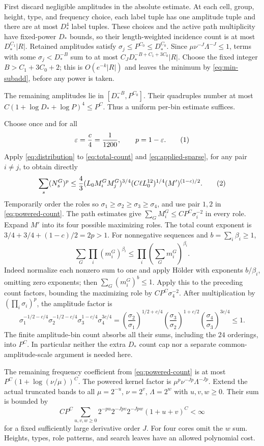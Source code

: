 \documentclass[11pt]{article}
\theoremstyle{definition}
\newcommand{\eqtag}[1]{\refstepcounter{equation}\tag{\theequation}\label{#1}}
\numberwithin{equation}{section}
\begin{document}
First discard negligible amplitudes in the absolute estimate. At each cell, group, height, type, and frequency choice, each label tuple has one amplitude tuple and there are at most $D_*^4$ label tuples. These choices and the active path multiplicity have fixed-power $D_*$ bounds, so their length-weighted incidence count is at most $D_*^{C_1}|R|$. Retained amplitudes satisfy $\sigma_j\le P^{C_0}\le D_*^{C_0}$. Since $\mu\nu^{-J}\Lambda^{-J}\le1$, terms with some $\sigma_j<D_*^{-B}$ sum to at most $C_JD_*^{-B+C_1+3C_0}|R|$. Choose the fixed integer $B>C_1+3C_0+2$; this is $O(e^{-k}|R|)$ and leaves the minimum by \eqref{eq:min-subadd}, before any power is taken.

The remaining amplitudes lie in $[D_*^{-B},P^{C_0}]$. Their quadruples number at most $C(1+\log D_*+\log P)^4\le P^C$. Thus a uniform per-bin estimate suffices.

Choose once and for all
\[
 \varepsilon=\frac{c}{4}=\frac1{1200},\qquad p=1-\varepsilon.
 \eqtag{eq:fixed-power}
\]
Apply \eqref{eq:distribution} to \eqref{eq:total-count} and \eqref{eq:applied-sparse}, for any pair $i\ne j$, to obtain directly
\[
 \sum_s(N_s^G)^p
 \le\frac43(L_0M_i^GM_j^G)^{3/4}(C\ell L_0^{12})^{1/4}(M')^{(1-c)/2}.
 \eqtag{eq:powered-count}
\]
Temporarily order the roles so $\sigma_1\ge\sigma_2\ge\sigma_3\ge\sigma_4$, and use pair $1,2$ in \eqref{eq:powered-count}. The path estimates give $\sum_GM_i^G\le CP^C\sigma_i^{-2}$ in every role. Expand $M'$ into its four possible maximizing roles. The total count exponent is $3/4+3/4+(1-c)/2=2p>1$. For nonnegative sequences and $b=\sum_i\beta_i\ge1$,
\[
 \sum_G\prod_i(m_i^G)^{\beta_i}
 \le\prod_i\left(\sum_Gm_i^G\right)^{\beta_i}.
\]
Indeed normalize each nonzero sum to one and apply H\"older with exponents $b/\beta_i$, omitting zero exponents; then $\sum_G(m_i^G)^b\le1$. Apply this to the preceding count factors, bounding the maximizing role by $CP^C\sigma_4^{-2}$. After multiplication by $(\prod_i\sigma_i)^p$, the amplitude factor is
\[
 \sigma_1^{-1/2-c/4}\sigma_2^{-1/2-c/4}
 \sigma_3^{1-c/4}\sigma_4^{3c/4}
 =\left(\frac{\sigma_2}{\sigma_1}\right)^{1/2+c/4}
  \left(\frac{\sigma_3}{\sigma_2}\right)^{1+c/2}
  \left(\frac{\sigma_4}{\sigma_3}\right)^{3c/4}\le1.
\]
The finite amplitude-bin count absorbs all their sums, including the $24$ orderings, into $P^C$. In particular neither the extra $D_*$ count cap nor a separate common-amplitude-scale argument is needed here.

The remaining frequency coefficient from \eqref{eq:powered-count} is at most $P^C(1+\log(\nu/\mu))^C$. The powered kernel factor is $\mu^p\nu^{-Jp}\Lambda^{-Jp}$. Extend the actual truncated bands to all $\mu=2^{-u}$, $\nu=2^v$, $\Lambda=2^w$ with $u,v,w\ge0$. Their sum is bounded by
\[
 C P^C\sum_{u,v,w\ge0}2^{-pu}2^{-Jpv}2^{-Jpw}(1+u+v)^C<\infty
\]
for a fixed sufficiently large derivative order $J$. For four cores omit the $w$ sum. Heights, types, role patterns, and search leaves have an allowed polynomial cost.
\end{document}
